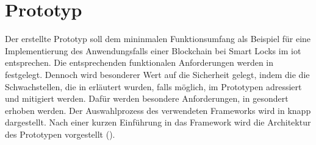 \section{Prototyp}
\label{sec:prototype}
    Der erstellte Prototyp soll dem mininmalen Funktionsumfang als Beispiel für eine Implementierung des Anwendungsfalls einer Blockchain bei Smart Locks im \gls{iot} entsprechen. 
    Die entsprechenden funktionalen Anforderungen werden in  festgelegt. 
    Dennoch wird besonderer Wert auf die Sicherheit gelegt, indem die die Schwachstellen, die in  erläutert wurden, falls möglich, im Prototypen adressiert und mitigiert werden. 
    Dafür werden besondere Anforderungen, in  gesondert erhoben werden.
    Der Auswahlprozess des verwendeten Frameworks wird in  knapp dargestellt.
    Nach einer kurzen Einführung in das Framework wird die Architektur des Prototypen vorgestellt (). 

